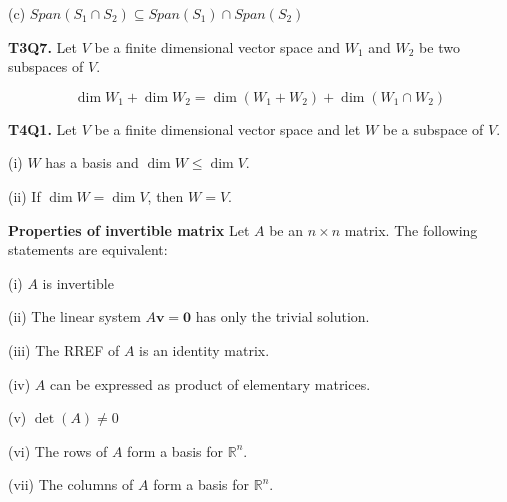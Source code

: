\documentclass[10pt,landscape]{article}
\begin{document}
\begin{multicols}{4}
(c) $Span(S_1 \cap S_2) \subseteq Span(S_1) \cap Span(S_2)$









\textbf{T3Q7.} Let $V$ be a finite dimensional vector space and $W_1$ and $W_2$ be two subspaces of $V$.

$$
\dim W_1 + \dim W_2 = \dim(W_1 + W_2) + \dim (W_1 \cap W_2)
$$

\textbf{T4Q1.} Let $V$ be a finite dimensional vector space and let $W$ be a subspace of $V$. 

(i) $W$ has a basis and $\dim W \leq \dim V$.

(ii) If $\dim W = \dim V$, then $W = V$.


\textbf{Properties of invertible matrix} Let $A$ be an $n \times n$ matrix. The following statements are equivalent:

(i) $A$ is invertible

(ii) The linear system $A\textbf{v} = \textbf{0}$ has only the trivial solution.

(iii) The RREF of $A$ is an identity matrix.

(iv) $A$ can be expressed as product of elementary matrices.

(v) $\det (A) \neq 0$ 

(vi) The rows of $A$ form a basis for $\mathbb{R}^n$.

(vii) The columns of $A$ form a basis for $\mathbb{R}^n$.


\end{multicols}
\end{document}
